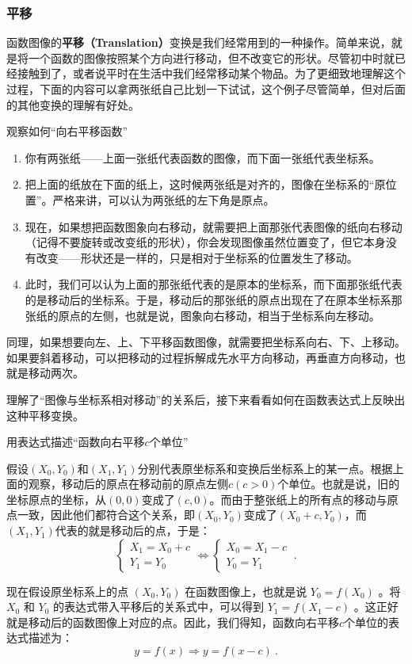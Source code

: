 \subsubsection{平移}

函数图像的\textbf{平移（Translation）}变换是我们经常用到的一种操作。简单来说，就是将一个函数的图像按照某个方向进行移动，但不改变它的形状。尽管初中时就已经接触到了，或者说平时在生活中我们经常移动某个物品。为了更细致地理解这个过程，下面的内容可以拿两张纸自己比划一下试试，这个例子尽管简单，但对后面的其他变换的理解有好处。

\begin{example}{观察如何“向右平移函数”}
\begin{enumerate}
\item 你有两张纸——上面一张纸代表函数的图像，而下面一张纸代表坐标系。
\item 把上面的纸放在下面的纸上，这时候两张纸是对齐的，图像在坐标系的“原位置”。严格来讲，可以认为两张纸的左下角是原点。
\item 现在，如果想把函数图象向右移动，就需要把上面那张代表图像的纸向右移动（记得不要旋转或改变纸的形状），你会发现图像虽然位置变了，但它本身没有改变——形状还是一样的，只是相对于坐标系的位置发生了移动。
\item 此时，我们可以认为上面的那张纸代表的是原本的坐标系，而下面那张纸代表的是移动后的坐标系。于是，移动后的那张纸的原点出现在了在原本坐标系那张纸的原点的左侧，也就是说，图象向右移动，相当于坐标系向左移动。
\end{enumerate}
\end{example}

同理，如果想要向左、上、下平移函数图像，就需要把坐标系向右、下、上移动。如果要斜着移动，可以把移动的过程拆解成先水平方向移动，再垂直方向移动，也就是移动两次。

理解了“图像与坐标系相对移动”的关系后，接下来看看如何在函数表达式上反映出这种平移变换。

\begin{example}{用表达式描述“函数向右平移$c$个单位”}

假设$(X_0,Y_0)$和$(X_1,Y_1)$分别代表原坐标系和变换后坐标系上的某一点。根据上面的观察，移动后的原点在移动前的原点左侧$c(c>0)$个单位。也就是说，旧的坐标原点的坐标，从$(0,0)$变成了$(c,0)$。而由于整张纸上的所有点的移动与原点一致，因此他们都符合这个关系，即$(X_0,Y_0)$变成了$(X_0+c,Y_0)$，而$(X_1,Y_1)$代表的就是移动后的点，于是：
\begin{equation}
\begin{cases}
X_1=X_0+c\\
Y_1=Y_0
\end{cases}\iff
\begin{cases}
X_0=X_1-c\\
Y_0=Y_1
\end{cases}~.
\end{equation}

现在假设原坐标系上的点  $(X_0, Y_0)$  在函数图像上，也就是说  $Y_0 = f(X_0)$ 。将  $X_0$  和  $Y_0$  的表达式带入平移后的关系式中，可以得到  $Y_1 = f(X_1 - c)$ 。这正好就是移动后的函数图像上对应的点。因此，我们得知，函数向右平移$c$个单位的表达式描述为：
\begin{equation}
y=f(x)\Rightarrow y=f(x-c)~.
\end{equation}
\end{example}

